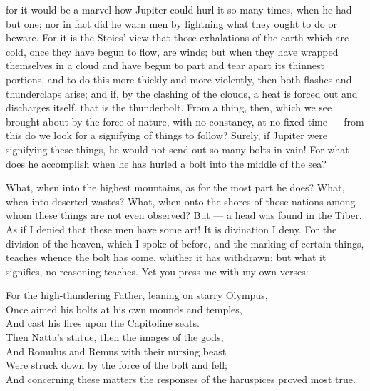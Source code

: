  for it would be a marvel how Jupiter could hurl it so many times, when he had but one; nor in fact did he warn men by lightning what they ought to do or beware. For it is the Stoics' view that those exhalations of the earth which are cold, once they have begun to flow, are winds; but when they have wrapped themselves in a cloud and have begun to part and tear apart its thinnest portions, and to do this more thickly and more violently, then both flashes and thunderclaps arise; and if, by the clashing of the clouds, a heat is forced out and discharges itself, that is the thunderbolt. From a thing, then, which we see brought about by the force of nature, with no constancy, at no fixed time — from this do we look for a signifying of things to follow? Surely, if Jupiter were signifying these things, he would not send out so many bolts in vain! For what does he accomplish when he has hurled a bolt into the middle of the sea?

 What, when into the highest mountains, as for the most part he does? What, when into deserted wastes? What, when onto the shores of those nations among whom these things are not even observed? But — a head was found in the Tiber. As if I denied that these men have some art! It is divination I deny. For the division of the heaven, which I spoke of before, and the marking of certain things, teaches whence the bolt has come, whither it has withdrawn; but what it signifies, no reasoning teaches. Yet you press me with my own verses:

For the high-thundering Father, leaning on starry Olympus, \\
Once aimed his bolts at his own mounds and temples, \\
And cast his fires upon the Capitoline seats. \\
Then Natta's statue, then the images of the gods, \\
And Romulus and Remus with their nursing beast \\
Were struck down by the force of the bolt and fell; \\
And concerning these matters the responses of the haruspices proved most true.

